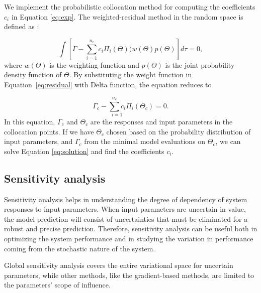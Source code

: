 We implement the probabilistic collocation method for computing the
coefficients $c_i$ in Equation \ref{eq:exp}. The weighted-residual method in
the random space is defined as \cite{nLi2007}:


\begin{equation}
\int\left[\Gamma-\underset{i=1}{\overset{n_c}{\sum}}c_{i}\Pi_{i}
(\Theta))w(\Theta)p(\Theta)\right]d\tau=0,\label{eq:residual}
\end{equation}
where $w(\Theta)$ is the weighting function and $p(\Theta)$ is the joint
probability density function of $\Theta$. By substituting the weight function in
Equation~\ref{eq:residual} with  Delta function, the equation reduces to

\begin{equation}
 \Gamma_{c}-\underset{i=1}{\overset{n_c}{\sum}c_{i}}\Pi_{i}(\Theta_{c})=0.
\label{eq:solution}
\end{equation} In this equation, $\Gamma_c$ and $\Theta_c$ are the responses and
input parameters in the collocation points. If we have $\Theta_c$ chosen based
on the probability distribution of input parameters, and $\Gamma_c$ from the
minimal model evaluations on $\Theta_c$, we can solve Equation
\ref{eq:solution} and find the coefficients $c_i$.

\subsection{Sensitivity analysis}
\label{Section:SA}

Sensitivity analysis helps in understanding the degree of dependency of system
responses to input parameters. When input parameters are uncertain in
value, the model prediction will consist of uncertainties that must be
eliminated for a robust and precise prediction. Therefore, sensitivity analysis
can be useful both in optimizing the system performance and in studying the
variation in performance coming from the stochastic nature of the system.

Global sensitivity analysis covers the entire variational space for uncertain
parameters, while other methods, like the gradient-based methods, are limited
to the parameters' scope of influence. 

